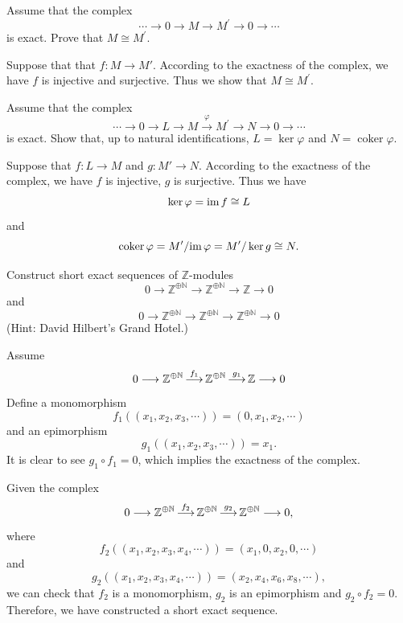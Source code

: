 \documentclass[12pt,letterpaper,boxed]{hmcpset}
\newcommand{\im}{\mathrm{im}\hspace{1.5pt}}
\begin{document}
\begin{problem}[7.2]
Assume that the complex
\[
\cdots \longrightarrow 0 \longrightarrow M \longrightarrow M^{\prime} \longrightarrow 0 \longrightarrow \cdots
\]
is exact. Prove that $M \cong M^{\prime}$.
\end{problem}
\begin{solution}
	Suppose that  that $f:M\to M'$. According to the exactness of the complex, we have $f$ is injective and surjective. Thus we show that $M \cong M^{\prime}$.
\end{solution}


\begin{problem}[7.3]
Assume that the complex
\[
\cdots \longrightarrow 0 \longrightarrow L \longrightarrow M \stackrel{\varphi}{\longrightarrow} M^{\prime} \longrightarrow N \longrightarrow 0 \longrightarrow \cdots
\]
is exact. Show that, up to natural identifications, $L=\operatorname{ker} \varphi$ and $N=\operatorname{coker} \varphi$.

\end{problem}
\begin{solution}
Suppose that $f:L\to M$ and $g:M'\to N$. According to the exactness of the complex, we have $f$ is injective, $g$ is surjective. Thus we have
$$
\ker\varphi=\im f\cong L
$$
and
$$
\operatorname{coker} \varphi= M'/\im \varphi=M'/\ker g\cong N.
$$
\end{solution}

\begin{problem}[7.4]
Construct short exact sequences of $\mathbb{Z}$-modules
\[
0 \longrightarrow \mathbb{Z}^{\oplus \mathbb{N}} \longrightarrow \mathbb{Z}^{\oplus \mathbb{N}} \longrightarrow \mathbb{Z} \longrightarrow 0
\]
and
\[
0 \longrightarrow \mathbb{Z}^{\oplus \mathbb{N}} \longrightarrow \mathbb{Z}^{\oplus \mathbb{N}} \longrightarrow \mathbb{Z}^{\oplus \mathbb{N}} \longrightarrow 0
\]
(Hint: David Hilbert's Grand Hotel.)
\end{problem}

\begin{solution}
Assume
\[
0 \longrightarrow \mathbb{Z}^{\oplus \mathbb{N}} \operatornamewithlimits{\longrightarrow}^{f_1} \mathbb{Z}^{\oplus \mathbb{N}} \operatornamewithlimits{\longrightarrow}^{g_1} \mathbb{Z} \longrightarrow 0
\]	
Define a monomorphism
$$
f_1((x_1,x_2,x_3,\cdots))=(0,x_1,x_2,\cdots)
$$
and an epimorphism
\[
g_1((x_1,x_2,x_3,\cdots))=x_1.
\]
It is clear to see $g_1\circ f_1=0$, which implies the exactness of the complex.

\noindent Given the complex
\[
0 \longrightarrow \mathbb{Z}^{\oplus \mathbb{N}} \operatornamewithlimits{\longrightarrow}^{f_2} \mathbb{Z}^{\oplus \mathbb{N}} \operatornamewithlimits{\longrightarrow}^{g_2} \mathbb{Z}^{\oplus \mathbb{N}}\longrightarrow 0,
\]
where
$$
f_2((x_1,x_2,x_3,x_4,\cdots))=(x_1,0,x_2,0,\cdots)
$$
and 
\[
g_2((x_1,x_2,x_3,x_4,\cdots))=(x_2,x_4,x_6,x_8,\cdots),
\]
we can check that $f_2$ is a monomorphism, $g_2$ is an epimorphism and $g_2\circ f_2=0$. Therefore, we have constructed a short exact sequence.
\end{solution}
\end{document}
